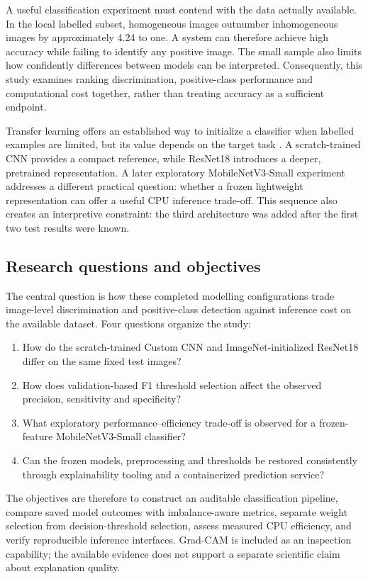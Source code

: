 \documentclass[11pt,a4paper]{article}
\newcommand{\mobile}{MobileNetV3-Small}
\begin{document}
A useful classification experiment must contend with the data actually available. In the local labelled subset, homogeneous images outnumber inhomogeneous images by approximately 4.24 to one. A system can therefore achieve high accuracy while failing to identify any positive image. The small sample also limits how confidently differences between models can be interpreted. Consequently, this study examines ranking discrimination, positive-class performance and computational cost together, rather than treating accuracy as a sufficient endpoint.

Transfer learning offers an established way to initialize a classifier when labelled examples are limited, but its value depends on the target task \citep{raghu2019}. A scratch-trained CNN provides a compact reference, while ResNet18 introduces a deeper, pretrained representation. A later exploratory \mobile{} experiment addresses a different practical question: whether a frozen lightweight representation can offer a useful CPU inference trade-off. This sequence also creates an interpretive constraint: the third architecture was added after the first two test results were known.

\subsection{Research questions and objectives}
The central question is how these completed modelling configurations trade image-level discrimination and positive-class detection against inference cost on the available dataset. Four questions organize the study:
\begin{enumerate}
\item How do the scratch-trained Custom CNN and ImageNet-initialized ResNet18 differ on the same fixed test images?
\item How does validation-based F1 threshold selection affect the observed precision, sensitivity and specificity?
\item What exploratory performance--efficiency trade-off is observed for a frozen-feature \mobile{} classifier?
\item Can the frozen models, preprocessing and thresholds be restored consistently through explainability tooling and a containerized prediction service?
\end{enumerate}
The objectives are therefore to construct an auditable classification pipeline, compare saved model outcomes with imbalance-aware metrics, separate weight selection from decision-threshold selection, assess measured CPU efficiency, and verify reproducible inference interfaces. Grad-CAM is included as an inspection capability; the available evidence does not support a separate scientific claim about explanation quality.
\end{document}
